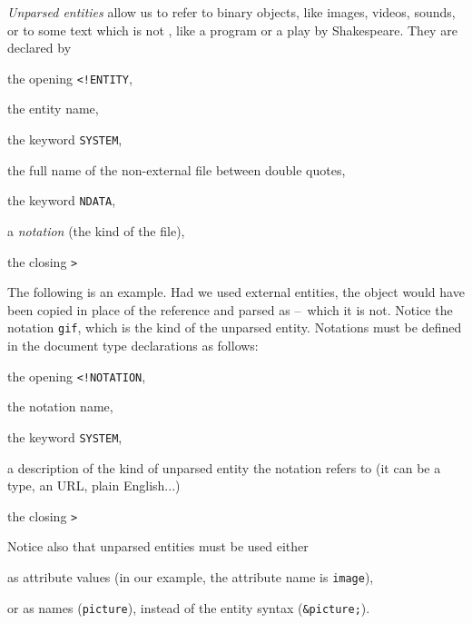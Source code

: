 \emph{Unparsed entities} allow us to refer to binary objects, like
images, videos, sounds, or to some text which is not \XML, like a
program or a play by Shakespeare. They are declared by
\begin{enumerate*}

  \item the opening \verb|<!ENTITY|,

  \item the entity name,

  \item the keyword \verb|SYSTEM|,

  \item the full name of the non\hyp{}\XML external file between
    double quotes,

  \item the keyword \verb|NDATA|,

  \item a \emph{notation} (the kind of the file),

  \item the closing \verb|>|

\end{enumerate*}
The following is an example.
\noindent Had we used external entities, the object would have been
copied in place of the reference and parsed as \XML{} --~which it is
not. Notice the notation \texttt{gif}, which is the kind of the
unparsed entity. Notations must be defined in the document type
declarations as follows:
\begin{enumerate*}

  \item the opening \verb|<!NOTATION|,

  \item the notation name,

  \item the keyword \verb|SYSTEM|,

  \item a description of the kind of unparsed entity the notation
    refers to (it can be a \MIME type, an URL, plain English...)

  \item the closing \verb|>|

\end{enumerate*}
Notice also that unparsed entities must be used either
\begin{itemize*}

  \item as attribute values (in our example, the attribute name is
  \texttt{image}),

  \item or as names (\texttt{picture}), instead of the entity syntax
    (\texttt{\&picture;}).

\end{itemize*}
